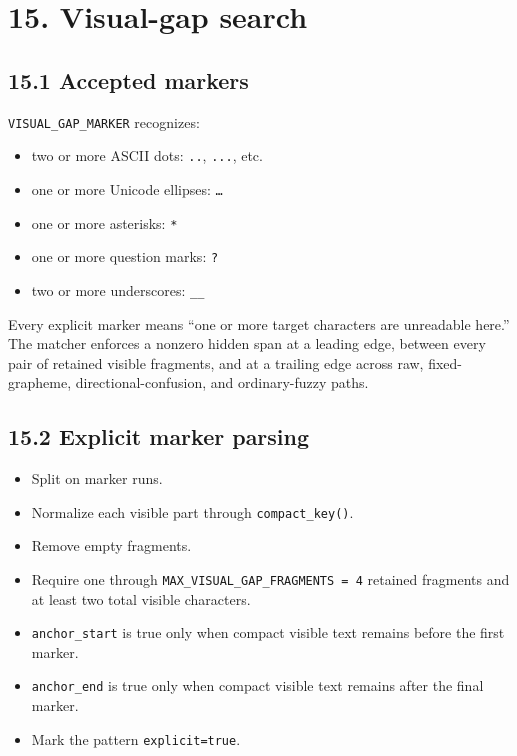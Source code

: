 \section{15. Visual-gap search}\label{15-visual-gap-search}

\subsection{15.1 Accepted markers}\label{151-accepted-markers}

\texttt{VISUAL\_\allowbreak{}GAP\_\allowbreak{}MARKER} recognizes:

\begin{itemize}
\tightlist
\item
  two or more ASCII dots: \texttt{..}, \texttt{...}, etc.
\item
  one or more Unicode ellipses: \texttt{…}
\item
  one or more asterisks: \texttt{*}
\item
  one or more question marks: \texttt{?}
\item
  two or more underscores: \texttt{\_\allowbreak{}\_\allowbreak{}}
\end{itemize}

Every explicit marker means ``one or more target characters are unreadable here.'' The matcher enforces a nonzero hidden span at a leading edge, between every pair of retained visible fragments, and at a trailing edge across raw, fixed-grapheme, directional-confusion, and ordinary-fuzzy paths.

\subsection{15.2 Explicit marker parsing}\label{152-explicit-marker-parsing}

\begin{itemize}
\tightlist
\item
  Split on marker runs.
\item
  Normalize each visible part through \texttt{compact\_\allowbreak{}key()}.
\item
  Remove empty fragments.
\item
  Require one through \texttt{MAX\_\allowbreak{}VISUAL\_\allowbreak{}GAP\_\allowbreak{}FRAGMENTS\ =\ 4} retained fragments and at least two total visible characters.
\item
  \texttt{anchor\_\allowbreak{}start} is true only when compact visible text remains before the
  first marker.
\item
  \texttt{anchor\_\allowbreak{}end} is true only when compact visible text remains after the final
  marker.
\item
  Mark the pattern \texttt{explicit=true}.
\end{itemize}

